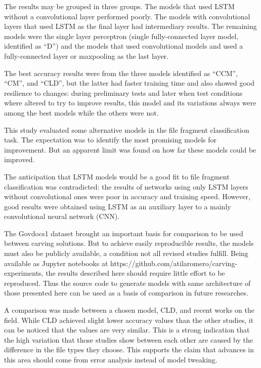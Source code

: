 The results may be grouped in three groups. The models that used LSTM without a convolutional layer performed poorly. The models with convolutional layers that used LSTM as the final layer had intermediary results. The remaining models were the single layer perceptron (single fully-connected layer model, identified as ``D'') and the models that used convolutional models and used a fully-connected layer or maxpooling as the last layer.

The best accuracy results were from the three models identified as ``CCM'', ``CM'', and ``CLD'', but the latter had faster training time and also showed good resilience to changes: during preliminary tests and later when test conditions where altered to try to improve results, this model and its variations always were among the best models while the others were not.

This study evaluated some alternative models in the file fragment classification task. The expectation was to identify the most promising models for improvement. But an apparent limit was found on how far these models could be improved. 

The anticipation that LSTM models would be a good fit to file fragment classification was contradicted: the results of networks using only LSTM layers without convolutional ones were poor in accuracy and training speed. However, good results were obtained using LSTM as an auxiliary layer to a mainly convolutional neural network (CNN). 

The Govdocs1 dataset brought an important basis for comparison to be used between carving solutions. But to achieve easily reproducible results, the models must also be publicly available, a condition not all revised studies fulfill. Being available as Jupyter notebooks at https://github.com/atilaromero/carving-experiments, the results described here should require little effort to be reproduced. Thus the source code to generate models with same architecture of those presented here can be used as a basis of comparison in future researches.

A comparison was made between a chosen model, CLD, and recent works on the field. While CLD achieved slight lower accuracy values than the other studies, it can be noticed that the values are very similar. This is a strong indication that the high  variation that those studies show between each other are caused by the difference in the file types they choose. This supports the claim that advances in this area should come from error analysis instead of model tweaking.

